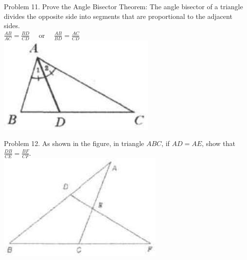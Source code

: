 \documentclass[10pt]{article}
\begin{document}
Problem 11. Prove the Angle Bisector Theorem: The angle bisector of a triangle divides the opposite side into segments that are proportional to the adjacent sides.\\
\(\frac{A B}{A C}=\frac{B D}{C D} \quad\) or \(\quad \frac{A B}{B D}=\frac{A C}{C D}\)\\
\includegraphics[max width=\textwidth, center]{2025_04_17_97bc1f7e44d93c271a88g-128(2)}

Problem 12. As shown in the figure, in triangle \(A B C\), if \(A D=A E\), show that \(\frac{D B}{C E}=\frac{B F}{C F}\).\\
\includegraphics[max width=\textwidth, center]{2025_04_17_97bc1f7e44d93c271a88g-128(1)}
\end{document}

